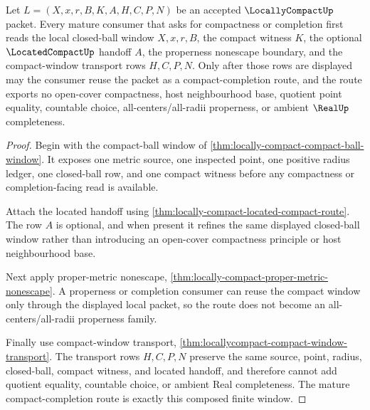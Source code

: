 \begin{theorem}
\label{thm:locallycompact-mature-compact-completion-route}
Let $L=(X,x,r,B,K,A,H,C,P,N)$ be an accepted $\LocallyCompactUp$ packet. Every mature consumer that asks for compactness or completion first reads the local closed-ball window $X,x,r,B$, the compact witness $K$, the optional $\LocatedCompactUp$ handoff $A$, the properness nonescape boundary, and the compact-window transport rows $H,C,P,N$. Only after those rows are displayed may the consumer reuse the packet as a compact-completion route, and the route exports no open-cover compactness, host neighbourhood base, quotient point equality, countable choice, all-centers/all-radii properness, or ambient $\RealUp$ completeness.
\end{theorem}
\begin{proof}
Begin with the compact-ball window of \autoref{thm:locally-compact-compact-ball-window}. It exposes one metric source, one inspected point, one positive radius ledger, one closed-ball row, and one compact witness before any compactness or completion-facing read is available.

Attach the located handoff using \autoref{thm:locally-compact-located-compact-route}. The row $A$ is optional, and when present it refines the same displayed closed-ball window rather than introducing an open-cover compactness principle or host neighbourhood base.

Next apply proper-metric nonescape, \autoref{thm:locally-compact-proper-metric-nonescape}. A properness or completion consumer can reuse the compact window only through the displayed local packet, so the route does not become an all-centers/all-radii properness family.

Finally use compact-window transport, \autoref{thm:locallycompact-compact-window-transport}. The transport rows $H,C,P,N$ preserve the same source, point, radius, closed-ball, compact witness, and located handoff, and therefore cannot add quotient equality, countable choice, or ambient Real completeness. The mature compact-completion route is exactly this composed finite window.
\end{proof}

